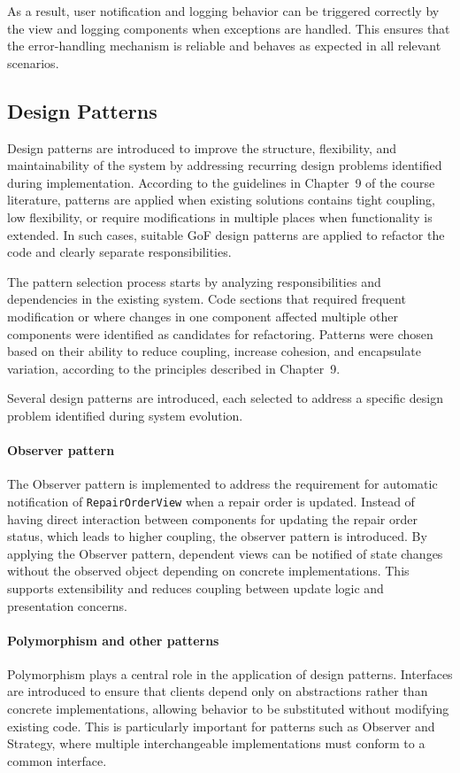 \documentclass[a4paper]{scrartcl}
\begin{document}
As a result, user notification and logging behavior can be triggered correctly by the view and logging components when exceptions are handled. This ensures that the error-handling mechanism is reliable and behaves as expected in all relevant scenarios.
\fi

\subsection{Design Patterns}

Design patterns are introduced to improve the structure, flexibility, and maintainability of the system by addressing recurring design problems identified during implementation. According to the guidelines in Chapter~9 of the course literature, patterns are applied when existing solutions contains tight coupling, low flexibility, or require modifications in multiple places when functionality is extended. In such cases, suitable GoF design patterns are applied to refactor the code and clearly separate responsibilities.

The pattern selection process starts by analyzing responsibilities and dependencies in the existing system. Code sections that required frequent modification or where changes in one component affected multiple other components were identified as candidates for refactoring. Patterns were chosen based on their ability to reduce coupling, increase cohesion, and encapsulate variation, according to the principles described in Chapter~9.

Several design patterns are introduced, each selected to address a specific design problem identified during system evolution.

\paragraph{Observer pattern}
The Observer pattern is implemented to address the requirement for automatic notification of \texttt{RepairOrderView} when a repair order is updated. Instead of having direct interaction between components for updating the repair order status, which leads to higher coupling, the observer pattern is introduced. By applying the Observer pattern, dependent views can be notified of state changes without the observed object depending on concrete implementations. This supports extensibility and reduces coupling between update logic and presentation concerns. 

\paragraph{Polymorphism and other patterns}
Polymorphism plays a central role in the application of design patterns. Interfaces are introduced to ensure that clients depend only on abstractions rather than concrete implementations, allowing behavior to be substituted without modifying existing code. This is particularly important for patterns such as Observer and Strategy, where multiple interchangeable implementations must conform to a common interface.
\end{document}
